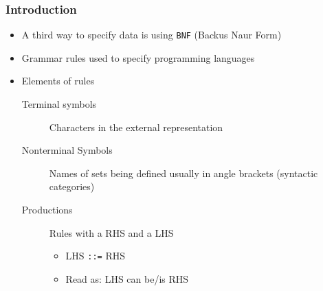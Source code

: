 \documentclass{beamer}
\newcommand{\is}{\texttt{::=}}
\begin{document}
\begin{frame}[fragile]
\frametitle{Introduction}
\begin{scriptsize}
\begin{itemize}
\item<1-> A third way to specify data is using \texttt{BNF} (Backus Naur Form)

\item<1-> Grammar rules used to specify programming languages

\item<2-> Elements of rules
  \begin{description}
    \item[Terminal symbols] Characters in the external representation \newline
    \item[Nonterminal Symbols] Names of sets being defined usually in angle brackets (syntactic categories) \newline
    \item[Productions] Rules with a RHS and a LHS
      \begin{itemize}
        \item LHS \is{} RHS \newline
        \item Read as: LHS can be/is RHS
      \end{itemize}
\end{description}


\end{itemize}
\end{scriptsize}
\end{frame}
\end{document}
